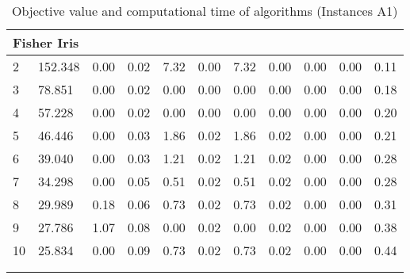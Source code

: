 {\begin{longtable}{@{}llccccccccc@{}}
\multicolumn{11}{l}{Fisher Iris}                                                                                                                                                                            \\ \hline
\multicolumn{1}{l|}{2}  & \multicolumn{1}{l|}{152.348}    & 0.00 & \multicolumn{1}{c|}{0.02} & 7.32 & \multicolumn{1}{c|}{0.00} & 7.32 & \multicolumn{1}{c|}{0.00} & 0.00           & 0.00           & 0.11 \\
\multicolumn{1}{l|}{3}  & \multicolumn{1}{l|}{78.851}     & 0.00 & \multicolumn{1}{c|}{0.02} & 0.00 & \multicolumn{1}{c|}{0.00} & 0.00 & \multicolumn{1}{c|}{0.00} & 0.00           & 0.00           & 0.18 \\
\multicolumn{1}{l|}{4}  & \multicolumn{1}{l|}{57.228}     & 0.00 & \multicolumn{1}{c|}{0.02} & 0.00 & \multicolumn{1}{c|}{0.00} & 0.00 & \multicolumn{1}{c|}{0.00} & 0.00           & 0.00           & 0.20 \\
\multicolumn{1}{l|}{5}  & \multicolumn{1}{l|}{46.446}     & 0.00 & \multicolumn{1}{c|}{0.03} & 1.86 & \multicolumn{1}{c|}{0.02} & 1.86 & \multicolumn{1}{c|}{0.02} & 0.00           & 0.00           & 0.21 \\
\multicolumn{1}{l|}{6}  & \multicolumn{1}{l|}{39.040}     & 0.00 & \multicolumn{1}{c|}{0.03} & 1.21 & \multicolumn{1}{c|}{0.02} & 1.21 & \multicolumn{1}{c|}{0.02} & 0.00           & 0.00           & 0.28 \\
\multicolumn{1}{l|}{7}  & \multicolumn{1}{l|}{34.298}     & 0.00 & \multicolumn{1}{c|}{0.05} & 0.51 & \multicolumn{1}{c|}{0.02} & 0.51 & \multicolumn{1}{c|}{0.02} & 0.00           & 0.00           & 0.28 \\
\multicolumn{1}{l|}{8}  & \multicolumn{1}{l|}{29.989}     & 0.18 & \multicolumn{1}{c|}{0.06} & 0.73 & \multicolumn{1}{c|}{0.02} & 0.73 & \multicolumn{1}{c|}{0.02} & 0.00           & 0.00           & 0.31 \\
\multicolumn{1}{l|}{9}  & \multicolumn{1}{l|}{27.786}     & 1.07 & \multicolumn{1}{c|}{0.08} & 0.00 & \multicolumn{1}{c|}{0.02} & 0.00 & \multicolumn{1}{c|}{0.02} & 0.00           & 0.00           & 0.38 \\
\multicolumn{1}{l|}{10} & \multicolumn{1}{l|}{25.834}     & 0.00 & \multicolumn{1}{c|}{0.09} & 0.73 & \multicolumn{1}{c|}{0.02} & 0.73 & \multicolumn{1}{c|}{0.02} & 0.00           & 0.00           & 0.44 \\ \hline
\caption{Objective value and computational time of algorithms (Instances A1)}\\
\label{results-all-A1}\\
\end{longtable}}
